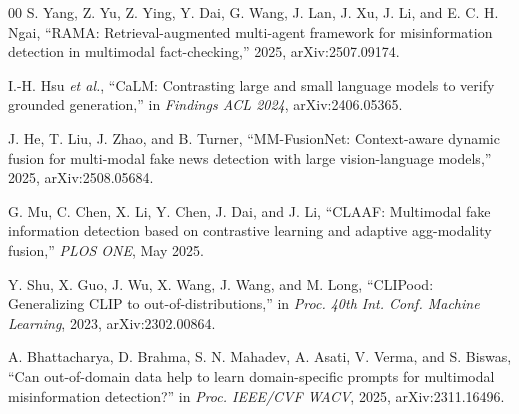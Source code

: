 \documentclass[conference,a4paper]{IEEEtran}
\begin{document}
\begin{thebibliography}{00}
 S. Yang, Z. Yu, Z. Ying, Y. Dai, G. Wang, J. Lan, J. Xu,
J. Li, and E. C. H. Ngai, ``RAMA: Retrieval-augmented multi-agent framework for
misinformation detection in multimodal fact-checking,'' 2025,
arXiv:2507.09174.

 I.-H. Hsu \emph{et al.}, ``CaLM: Contrasting large and small
language models to verify grounded generation,'' in \emph{Findings ACL 2024},
arXiv:2406.05365.

 J. He, T. Liu, J. Zhao, and B. Turner,
``MM-FusionNet: Context-aware dynamic fusion for multi-modal fake news
detection with large vision-language models,'' 2025, arXiv:2508.05684.

 G. Mu, C. Chen, X. Li, Y. Chen, J. Dai, and J. Li, ``CLAAF:
Multimodal fake information detection based on contrastive learning and
adaptive agg-modality fusion,'' \emph{PLOS ONE}, May 2025.

 Y. Shu, X. Guo, J. Wu, X. Wang, J. Wang, and M. Long,
``CLIPood: Generalizing CLIP to out-of-distributions,'' in \emph{Proc. 40th
Int. Conf. Machine Learning}, 2023, arXiv:2302.00864.

 A. Bhattacharya, D. Brahma, S. N. Mahadev, A. Asati,
V. Verma, and S. Biswas, ``Can out-of-domain data help to learn domain-specific prompts for
multimodal misinformation detection?'' in \emph{Proc. IEEE/CVF WACV}, 2025,
arXiv:2311.16496.

\end{thebibliography}

%
%
\end{document}
